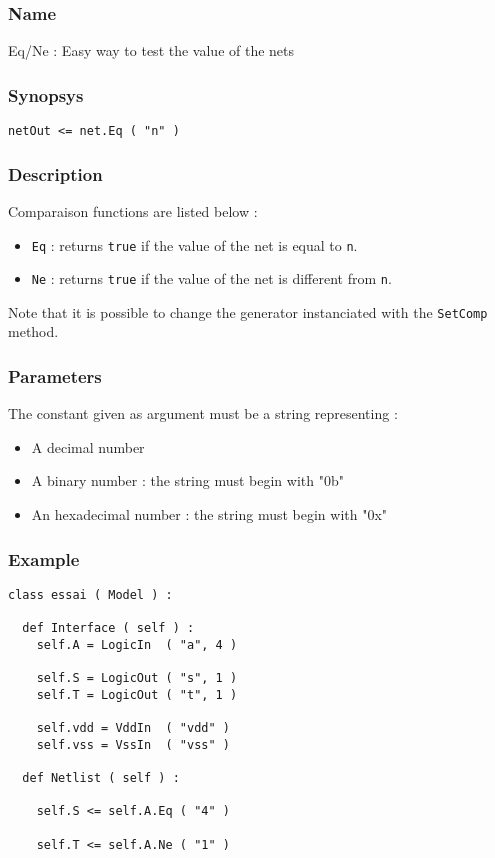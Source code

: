 \subsubsection{Name}

Eq/Ne : Easy way to test the value of the nets

\subsubsection{Synopsys}

\begin{verbatim}
netOut <= net.Eq ( "n" )
\end{verbatim}
  
\subsubsection{Description}

Comparaison functions are listed below :
\begin{itemize}
    \item \verb-Eq- : returns \verb-true- if the value of the net is equal to \verb-n-.
    \item \verb-Ne- : returns \verb-true- if the value of the net is different from \verb-n-.
\end{itemize}
\indent Note that it is possible to change the generator instanciated with the \verb-SetComp- method.

\subsubsection{Parameters}

The constant given as argument must be a string representing :
\begin{itemize}
    \item A decimal number
    \item A binary number : the string must begin with "0b"
    \item An hexadecimal number : the string must begin with "0x"
\end{itemize}    

\subsubsection{Example}

\begin{verbatim}
class essai ( Model ) :

  def Interface ( self ) :
    self.A = LogicIn  ( "a", 4 )
    
    self.S = LogicOut ( "s", 1 )
    self.T = LogicOut ( "t", 1 )

    self.vdd = VddIn  ( "vdd" )
    self.vss = VssIn  ( "vss" )
	
  def Netlist ( self ) :

    self.S <= self.A.Eq ( "4" )

    self.T <= self.A.Ne ( "1" )
\end{verbatim}
    
